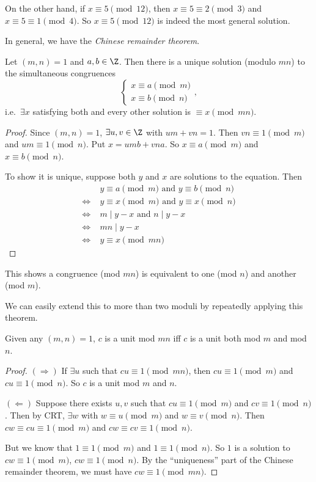 \documentclass[a4paper]{article}
\begin{document}
On the other hand, if $x\equiv 5\pmod {12}$, then $x\equiv 5\equiv 2 \pmod 3$ and $x\equiv 5\equiv 1\pmod 4$. So $x\equiv 5\pmod {12}$ is indeed the most general solution.

In general, we have the \emph{Chinese remainder theorem}.
\begin{thm}
  Let $(m, n) = 1$ and $a, b\in \Z$. Then there is a unique solution (modulo $mn$) to the simultaneous congruences
  \[
    \begin{cases}x\equiv a\pmod m \\ x\equiv b\pmod n \end{cases},
  \]
  i.e.\ $\exists x$ satisfying both and every other solution is $\equiv x \pmod {mn}$.
\end{thm}

\begin{proof}
  Since $(m, n) = 1$, $\exists u, v\in \Z$ with $um + vn = 1$. Then $vn \equiv 1\pmod m$ and $um \equiv 1 \pmod n$. Put $x = umb + vna$. So $x\equiv a\pmod m$ and $x\equiv b\pmod n$.

  To show it is unique, suppose both $y$ and $x$ are solutions to the equation. Then
  \begin{align*}
    &\; y \equiv a\pmod m \text{ and } y \equiv b\pmod n\\
    \Leftrightarrow &\; y \equiv x\pmod m \text{ and } y\equiv x\pmod n\\
    \Leftrightarrow &\; m \mid y - x\text{ and } n \mid y - x\\
    \Leftrightarrow &\; mn \mid y - x\\
    \Leftrightarrow &\; y \equiv x\pmod {mn}
  \end{align*}
\end{proof}
This shows a congruence (mod $mn$) is equivalent to one (mod $n$) and another (mod $m$).

We can easily extend this to more than two moduli by repeatedly applying this theorem.

\begin{prop}
  Given any $(m,n) = 1$, $c$ is a unit mod $mn$ iff $c$ is a unit both mod $m$ and mod $n$.
\end{prop}

\begin{proof}
  $(\Rightarrow)$ If $\exists u$ such that $cu \equiv 1 \pmod {mn}$, then $cu \equiv 1\pmod m$ and $cu\equiv 1\pmod n$. So $c$ is a unit mod $m$ and $n$.

  $(\Leftarrow)$ Suppose there exists $u, v$ such that $cu\equiv 1\pmod m$ and $cv \equiv 1\pmod n$. Then by CRT, $\exists w$ with $w\equiv u \pmod m$ and $w\equiv v\pmod n$. Then $cw\equiv cu\equiv 1\pmod m$ and $cw\equiv cv\equiv 1\pmod n$.

  But we know that $1\equiv 1\pmod m$ and $1\equiv 1\pmod n$. So $1$ is a solution to $cw \equiv 1\pmod m$, $cw\equiv 1\pmod n$. By the ``uniqueness'' part of the Chinese remainder theorem, we must have $cw\equiv 1\pmod {mn}$.
\end{proof}
\end{document}
